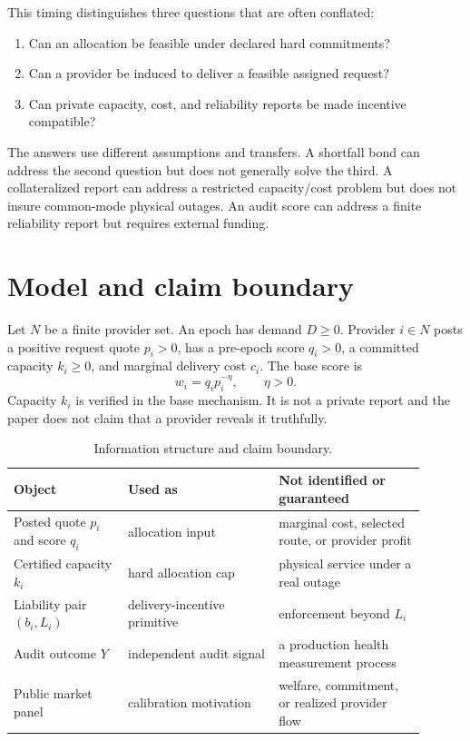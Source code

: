 \documentclass[11pt]{article}
\theoremstyle{definition}
\begin{document}
This timing distinguishes three questions that are often conflated:
\begin{enumerate}
  \item Can an allocation be feasible under declared hard commitments?
  \item Can a provider be induced to deliver a feasible assigned request?
  \item Can private capacity, cost, and reliability reports be made
  incentive compatible?
\end{enumerate}
The answers use different assumptions and transfers. A shortfall bond can
address the second question but does not generally solve the third. A
collateralized report can address a restricted capacity/cost problem but does
not insure common-mode physical outages. An audit score can address a finite
reliability report but requires external funding.

\section{Model and claim boundary}

Let $N$ be a finite provider set. An epoch has demand $D\geq 0$. Provider
$i\in N$ posts a positive request quote $p_i>0$, has a pre-epoch score
$q_i>0$, a committed capacity $k_i\geq 0$, and marginal delivery cost $c_i$.
The base score is
\[
  w_i=q_i p_i^{-\eta},\qquad \eta>0.
\]
Capacity $k_i$ is verified in the base mechanism. It is not a private report
and the paper does not claim that a provider reveals it truthfully.

\begin{table}[t]
\centering
\small
\begin{tabular}{p{0.25\linewidth}p{0.33\linewidth}p{0.32\linewidth}}
\toprule
Object & Used as & Not identified or guaranteed \\
\midrule
Posted quote $p_i$ and score $q_i$ & allocation input & marginal cost, selected route, or provider profit \\
Certified capacity $k_i$ & hard allocation cap & physical service under a real outage \\
Liability pair $(b_i,L_i)$ & delivery-incentive primitive & enforcement beyond $L_i$ \\
Audit outcome $Y$ & independent audit signal & a production health measurement process \\
Public market panel & calibration motivation & welfare, commitment, or realized provider flow \\
\bottomrule
\end{tabular}
\caption{Information structure and claim boundary.}
\label{tab:boundary}
\end{table}
\end{document}
